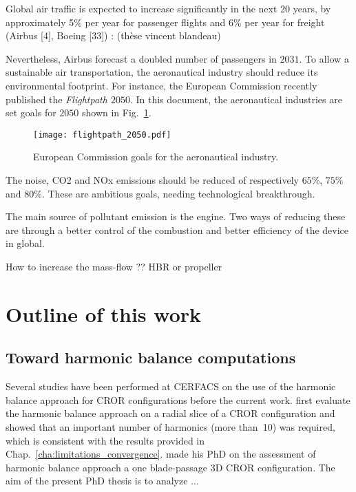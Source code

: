 Global air traffic is expected to increase significantly in the next 20 years, 
by approximately 5\% per year for passenger flights and 6\% 
per year for freight (Airbus [4], Boeing [33]) : (thèse vincent blandeau)


Nevertheless, Airbus forecast a doubled number of passengers in
$2031$. To allow a sustainable air transportation, the aeronautical
industry should reduce its environmental footprint. For instance,
the European Commission recently published the \emph{Flightpath $2050$}.
In this document, the aeronautical industries are set goals for $2050$
shown in Fig.~\ref{fig:flightpath_2050}.
\begin{figure}[htbp]
  \centering
  \texttt{[image: flightpath\_2050.pdf]}
  \caption{European Commission goals for the aeronautical industry. }
  \label{fig:flightpath_2050}
\end{figure}
The noise, CO2 and NOx emissions should be reduced of 
respectively $65\%$, $75\%$ and $80\%$.
These are ambitious goals, needing technological breakthrough.

The main source of pollutant emission is the engine. Two ways of reducing
these are through a better control of the combustion and better
efficiency of the device in global.

How to increase the mass-flow ??
HBR or propeller




\section{Outline of this work}
\label{sec:outline_of_this_work}

\subsection{Toward harmonic balance computations}
\label{sub:toward_harmonic_balance_computations}

Several studies have been performed at CERFACS on the use
of the harmonic balance approach for CROR configurations 
before the current work.
\citet{Yabili2010} first evaluate the harmonic balance approach
on a radial slice of a CROR configuration and showed that an
important number of harmonics (more than~10) was required,
which is consistent with the results provided in 
Chap.~\ref{cha:limitations_convergence}.
\citet{ThesisFrancois} made his PhD on the assessment of
harmonic balance approach a one blade-passage 3D CROR configuration.
The aim of the present PhD thesis is to analyze ...



